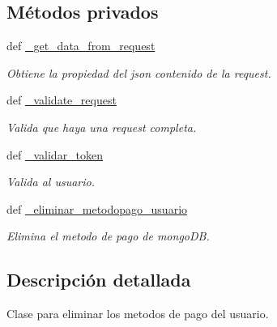 \subsection*{Métodos privados}
\begin{DoxyCompactItemize}
\item 
def \hyperlink{classsrc_1_1resources_1_1eliminar_metodo_pago_1_1_eliminar_metodo_pago_aed677bd6d19c7e0046e3fc6b30b015f3}{\-\_\-get\-\_\-data\-\_\-from\-\_\-request}
\begin{DoxyCompactList}\small\item\em Obtiene la propiedad del json contenido de la request. \end{DoxyCompactList}\item 
def \hyperlink{classsrc_1_1resources_1_1eliminar_metodo_pago_1_1_eliminar_metodo_pago_a5fd33fd21edf27aaa9f2732663438425}{\-\_\-validate\-\_\-request}
\begin{DoxyCompactList}\small\item\em Valida que haya una request completa. \end{DoxyCompactList}\item 
def \hyperlink{classsrc_1_1resources_1_1eliminar_metodo_pago_1_1_eliminar_metodo_pago_a6daec68a2988a4da0165ba95473f2127}{\-\_\-validar\-\_\-token}
\begin{DoxyCompactList}\small\item\em Valida al usuario. \end{DoxyCompactList}\item 
def \hyperlink{classsrc_1_1resources_1_1eliminar_metodo_pago_1_1_eliminar_metodo_pago_a088e9f321f112b0d06d34ce3f465ab18}{\-\_\-eliminar\-\_\-metodopago\-\_\-usuario}
\begin{DoxyCompactList}\small\item\em Elimina el metodo de pago de mongo\-D\-B. \end{DoxyCompactList}\end{DoxyCompactItemize}


\subsection{Descripción detallada}
Clase para eliminar los metodos de pago del usuario. 



